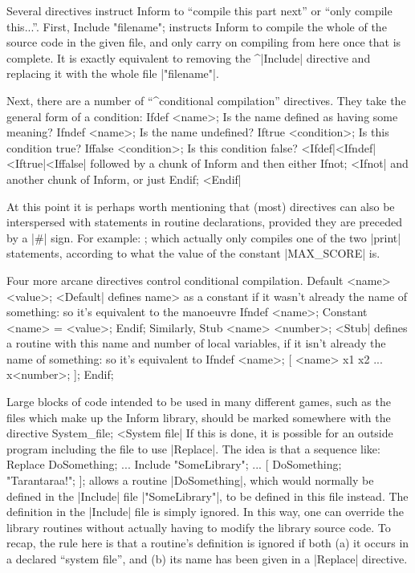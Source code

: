 %
Several directives instruct Inform to ``compile this part next'' or ``only
compile this...''.  First,
\beginstt
    Include "filename";
\endtt
instructs Inform to compile the whole of the source code in the given
file, and only carry on compiling from here once that is complete.  It is
exactly equivalent to removing the ^|Include| directive and replacing it
with the whole file |"filename"|.

\danger\ninepoint%
Next, there are a number of ``^{conditional compilation}'' directives.
They take the general form of a condition:
\beginstt
    Ifdef <name>;          Is the name defined as having some meaning?
    Ifndef <name>;         Is the name undefined?
    Iftrue <condition>;    Is this condition true?
    Iffalse <condition>;   Is this condition false?
\endtt^^|Ifdef|^^|Ifndef|^^|Iftrue|^^|Iffalse|
followed by a chunk of Inform and then either
\beginstt
    Ifnot;
\endtt^^|Ifnot|
and another chunk of Inform, or just
\beginstt
    Endif;
\endtt^^|Endif|

At this point it is perhaps worth mentioning that (most) directives can
also be interspersed with statements in routine declarations, provided
they are preceded by a |#| sign.  For example:
;
\endtt
which actually only compiles one of the two |print| statements, according to
what the value of the constant |MAX_SCORE| is.

\ddanger Four more arcane directives control conditional compilation.
\beginstt
    Default <name> <value>;
\endtt^^|Default|
defines \<name> as a constant if it wasn't already the name of something:
so it's equivalent to the manoeuvre
\beginstt
    Ifndef <name>;
    Constant <name> = <value>;
    Endif;
\endtt
Similarly,
\beginstt
    Stub <name> <number>;
\endtt^^|Stub|
defines a routine with this name and number of local variables, if it isn't
already the name of something: so it's equivalent to
\beginstt
    Ifndef <name>;
    [ <name> x1 x2 ... x<number>;
    ];
    Endif;
\endtt

\ddanger
Large blocks of code intended to be used in many different games, such as
the files which make up the Inform library, should be marked somewhere with
the directive
\beginstt
    System_file;
\endtt^^|System file|
If this is done, it is possible for an outside program including the file
to use |Replace|.  The idea is that a sequence like:
\beginstt
    Replace DoSomething;
    ...
    Include "SomeLibrary";
    ...
    [ DoSomething; "Tarantaraa!"; ];
\endtt
allows a routine |DoSomething|, which would normally be defined in the
|Include| file |"SomeLibrary"|, to be defined in this file instead.  The
definition in the |Include| file is simply ignored.  In this way, one can
override the library routines without actually having to modify the library
source code.  To recap, the rule here is that a routine's definition is
ignored if both (a) it occurs in a declared ``system file'', and (b)
its name has been given in a |Replace| directive.


